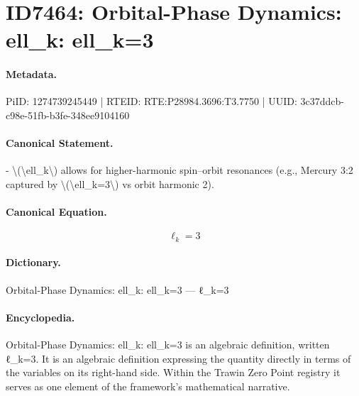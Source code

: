 \section*{ID7464: Orbital-Phase Dynamics: ell\_k: ell\_k=3}
\paragraph{Metadata.}
PiID: 1274739245449 | RTEID: RTE:P28984.3696:T3.7750 | UUID: 3c37ddcb-c98e-51fb-b3fe-348ee9104160

\paragraph{Canonical Statement.}
- \textbackslash{}(\textbackslash{}ell\_k\textbackslash{}) allows for higher-harmonic spin–orbit resonances (e.g., Mercury 3:2 captured by \textbackslash{}(\textbackslash{}ell\_k=3\textbackslash{}) vs orbit harmonic 2).

\paragraph{Canonical Equation.}
\[
\ell_k=3
\]

\paragraph{Dictionary.}
Orbital-Phase Dynamics: ell\_k: ell\_k=3 — ℓ\_k=3

\paragraph{Encyclopedia.}
Orbital-Phase Dynamics: ell\_k: ell\_k=3 is an algebraic definition, written ℓ\_k=3. It is an algebraic definition expressing the quantity directly in terms of the variables on its right-hand side. Within the Trawin Zero Point registry it serves as one element of the framework's mathematical narrative.
